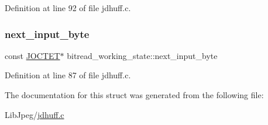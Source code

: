 Definition at line 92 of file jdhuff.\+c.

\mbox{\label{structbitread__working__state_a663f17ba1c850439118605f1842b2fbf}} 
\subsubsection{\texorpdfstring{next\_input\_byte}{next\_input\_byte}}
{\footnotesize\ttfamily const \mbox{\hyperlink{jmorecfg_8h_a356ad249f20e691b520da439f92cccbc}{J\+O\+C\+T\+ET}}$\ast$ bitread\+\_\+working\+\_\+state\+::next\+\_\+input\+\_\+byte}



Definition at line 87 of file jdhuff.\+c.



The documentation for this struct was generated from the following file\+:\begin{DoxyCompactItemize}
\item 
Lib\+Jpeg/\mbox{\hyperlink{jdhuff_8c}{jdhuff.\+c}}\end{DoxyCompactItemize}
